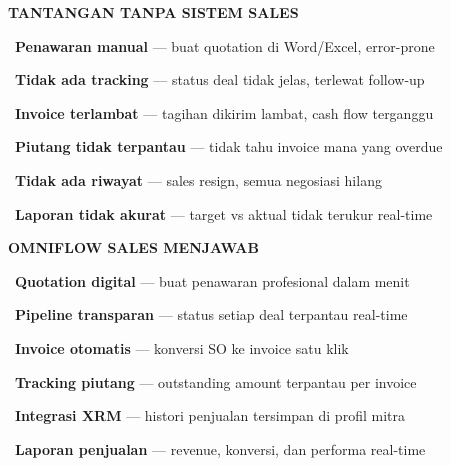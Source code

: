 \documentclass[a4paper]{article}
\begin{document}
\noindent
\begin{minipage}[t]{0.485\textwidth}
    \colorbox{RedLight}{%
        \begin{minipage}{\dimexpr\textwidth-2\fboxsep\relax}
            {\fontsize{10}{13}\selectfont\bfseries\color{RedText} TANTANGAN TANPA SISTEM SALES}
        \end{minipage}}\par
    \vspace{4pt}

    {\fontsize{9.5}{13}\selectfont\color{TextDark}%
    \textbullet\ \textbf{Penawaran manual} --- buat quotation di Word/Excel, error-prone\par\vspace{4pt}%
    \textbullet\ \textbf{Tidak ada tracking} --- status deal tidak jelas, terlewat follow-up\par\vspace{4pt}%
    \textbullet\ \textbf{Invoice terlambat} --- tagihan dikirim lambat, cash flow terganggu\par\vspace{4pt}%
    \textbullet\ \textbf{Piutang tidak terpantau} --- tidak tahu invoice mana yang overdue\par\vspace{4pt}%
    \textbullet\ \textbf{Tidak ada riwayat} --- sales resign, semua negosiasi hilang\par\vspace{4pt}%
    \textbullet\ \textbf{Laporan tidak akurat} --- target vs aktual tidak terukur real-time}%
\end{minipage}%
\hfill%
\begin{minipage}[t]{0.485\textwidth}
    \colorbox{IndigoPrimary}{%
        \begin{minipage}{\dimexpr\textwidth-2\fboxsep\relax}
            {\fontsize{10}{13}\selectfont\bfseries\color{White} OMNIFLOW SALES MENJAWAB}
        \end{minipage}}\par
    \vspace{4pt}

    {\fontsize{9.5}{13}\selectfont\color{TextDark}%
    \textbullet\ \textbf{Quotation digital} --- buat penawaran profesional dalam menit\par\vspace{4pt}%
    \textbullet\ \textbf{Pipeline transparan} --- status setiap deal terpantau real-time\par\vspace{4pt}%
    \textbullet\ \textbf{Invoice otomatis} --- konversi SO ke invoice satu klik\par\vspace{4pt}%
    \textbullet\ \textbf{Tracking piutang} --- outstanding amount terpantau per invoice\par\vspace{4pt}%
    \textbullet\ \textbf{Integrasi XRM} --- histori penjualan tersimpan di profil mitra\par\vspace{4pt}%
    \textbullet\ \textbf{Laporan penjualan} --- revenue, konversi, dan performa real-time}%
\end{minipage}
\end{document}
